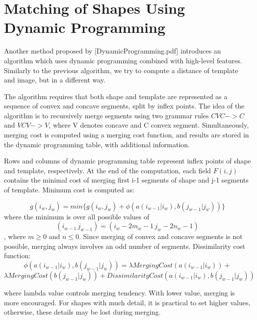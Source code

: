 \section{Matching of Shapes Using Dynamic Programming}
Another method proposed by [DynamicProgramming.pdf] introduces an algorithm which uses dynamic programming combined with high-level features. Similarly to the previous algorithm, we try to compute a distance of template and image, but in a different way.

The algorithm requires that both shape and template are represented as a sequence of convex and concave segments, split by inflex points. The idea of the algorithm is to recursively merge segments using two grammar rules $CVC -> C$ and $VCV -> V$, where V denotes concave and C convex segment. Simultaneously, merging cost is computed using a merging cost function, and results are stored in the dynamic programming table, with additional information.

Rows and columns of dynamic programming table represent inflex points of shape and template, respectively. At the end of the computation, each field $F(i,j)$ contains the minimal cost of merging first i-1 segments of shape and j-1 segments of template. Minimum cost is computed as:

\begin{equation*}
g(i_{w},j_{w}) = min\{g(i_{w},j_{w}) + \phi(a(i_{w-1}|i_{w}), b(j_{w-1}|j_{w}))\}
\end{equation*}
where the minimum is over all possible values of 
\begin{equation*}
(i_{w-1}\,j_{w-1})  =  (i_{w} - 2m_{w} -1\, j_{w} - 2n_{w} - 1)
\end{equation*}
, where $m \geq 0$ and $n \leq 0$.
Since merging of convex and concave segments is not possible, merging always involves an odd number of segments. Dissimilarity cost function: 
\begin{equation*}
\phi(a(i_{w-1}|i_{w}), b(j_{w-1}|j_{w}))  =  \lambda MergingCost(a(i_{w-1}|i_{w}))  +
\end{equation*}
\begin{equation*} 
\lambda MergingCost(b(j_{w-1}|j_{w}))  +  DissimilarityCost(a(i_{w-1}|i_{w}), b(j_{w-1}|j_{w}))
\end{equation*}

where lambda value controls merging tendency. With lower value, merging is more encouraged. For shapes with much detail, it is practical to set higher values, otherwise, these details may be lost during merging. 

